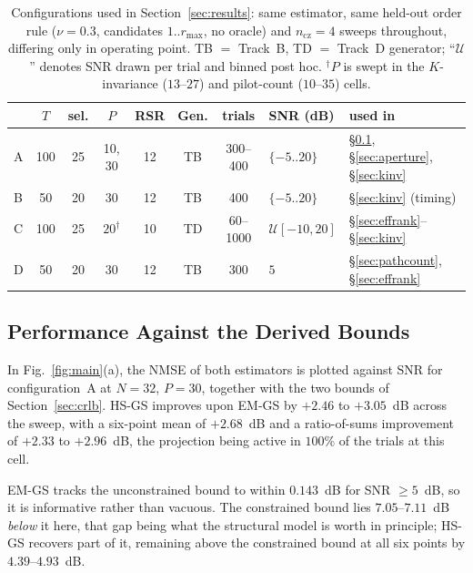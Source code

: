 \documentclass[journal]{IEEEtran}
\newcommand{\rmax}{r_{\max}}
\begin{document}
\begin{table}[!t]
\caption{Configurations used in Section~\ref{sec:results}: same estimator, same
held-out order rule ($\nu=0.3$, candidates $1..\rmax$, no oracle) and
$n_{\mathrm{cz}}=4$ sweeps throughout, differing only in operating point. TB $=$
Track~B, TD $=$ Track~D generator; ``$\mathcal{U}$'' denotes SNR drawn per trial
and binned post hoc. $^\dagger$$P$ is swept in the $K$-invariance ($13$--$27$)
and pilot-count ($10$--$35$) cells.}
\label{tab:config}
\centering
\scriptsize
\setlength{\tabcolsep}{2.5pt}
\begin{tabular}{lccccccll}
\toprule
 & $T$ & sel. & $P$ & RSR & Gen. & trials & SNR (dB) & used in \\
\midrule
A & 100 & 25 & 10, 30 & 12 & TB & 300--400 & $\{-5..20\}$ &
  \S\ref{sec:main}, \S\ref{sec:aperture}, \S\ref{sec:kinv} \\
B & 50 & 20 & 30 & 12 & TB & 400 & $\{-5..20\}$ &
  \S\ref{sec:kinv} (timing) \\
C & 100 & 25 & $20^\dagger$ & 10 & TD & 60--1000 & $\mathcal{U}[-10,20]$ &
  \S\ref{sec:effrank}--\S\ref{sec:kinv} \\
D & 50 & 20 & 30 & 12 & TB & 300 & $5$ &
  \S\ref{sec:pathcount}, \S\ref{sec:effrank} \\
\bottomrule
\end{tabular}
\end{table}

\subsection{Performance Against the Derived Bounds}
\label{sec:main}

In Fig.~\ref{fig:main}(a), the NMSE of both estimators is plotted against SNR
for configuration~A at $N=32$, $P=30$, together with the two bounds of
Section~\ref{sec:crlb}. HS-GS improves upon EM-GS by $+2.46$ to $+3.05$~dB
across the sweep, with a six-point mean of $+2.68$~dB and a ratio-of-sums
improvement of $+2.33$ to $+2.96$~dB, the projection being active in $100\%$ of
the trials at this cell.

EM-GS tracks the
unconstrained bound to within $0.143$~dB for SNR $\ge5$~dB, so it is informative
rather than vacuous. The constrained bound lies $7.05$--$7.11$~dB \emph{below}
it here, that gap being what the structural model is worth in principle; HS-GS
recovers part of it, remaining above the constrained bound at all six points by
$4.39$--$4.93$~dB.
\end{document}
